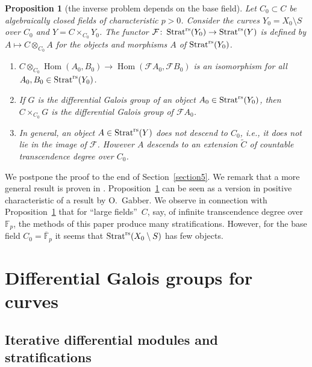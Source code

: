 \documentclass[10pt,a4paper]{amsart}
\numberwithin{equation}{section}
\newtheorem{Proposition}[Theorem]{Proposition}
\begin{document}
\begin{Proposition}[the inverse problem depends on the base field]\label{1.1}
Let $C_0\subset C$ be algebraically closed fields of characteristic $p>0$. Consider the curves
$Y_0=X_0\setminus S$ over $C_0$ and $Y=C\times_{C_0}Y_0$. The functor $\mathcal{F}\colon \operatorname{Strat}^{\rm rs}(Y_0)\rightarrow \operatorname{Strat}^{\rm rs}(Y)$ is defined by $A\mapsto C\otimes_{C_0}A$ for the objects and morphisms $A$ of $\operatorname{Strat}^{\rm rs}(Y_0)$.
\begin{enumerate}\itemsep=0pt
\item[$(1)$] $C\otimes _{C_0}\operatorname{Hom}(A_0,B_0)\rightarrow \operatorname{Hom}(\mathcal{F}A_0,\mathcal{F}B_0)$ is an isomorphism for all $A_0,B_0\in \operatorname{Strat}^{\rm rs}(Y_0)$.
\item[$(2)$] If $G$ is the differential Galois group of an object $A_0\in \operatorname{Strat}^{\rm rs}(Y_0)$, then $C\times_{C_0}G$ is the differential Galois group of $\mathcal{F}A_0$.
\item[$(3)$] In general, an object $A\in \operatorname{Strat}^{\rm rs}(Y)$ does not descend to $C_0$, i.e., it does not lie in the image of $\mathcal{F}$. However $A$ descends to an extension $\tilde{C}$ of countable transcendence degree over $C_0$.
\end{enumerate}
\end{Proposition}

We postpone the proof to the end of Section~\ref{section5}. We remark that a more general result is proven in \cite{Ba}. Proposition~\ref{1.1} can be seen as a version in positive characteristic of a result \cite[Proposition~1.3.2]{Ka} by O.~Gabber. We observe in connection with Proposition~\ref{1.1} that for ``large fields''~$C$, say, of infinite
transcendence degree over~$\mathbb{F}_p$, the methods of this paper produce many stratifications. However, for the base field $C_0=\overline{\mathbb{F}}_p$ it seems that
$\operatorname{Strat}^{\rm rs}(X_0\setminus S)$ has few objects.

\section{Differential Galois groups for curves}\label{section2}
\subsection{Iterative differential modules and stratifications}\label{section2.1}
\end{document}
